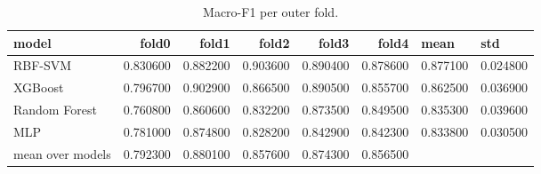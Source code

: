 \begin{table}
\caption{Macro-F1 per outer fold.}
\label{tab:s1_folds}
\begin{tabular}{lrrrrrll}
\toprule
model & fold0 & fold1 & fold2 & fold3 & fold4 & mean & std \\
\midrule
RBF-SVM & 0.830600 & 0.882200 & 0.903600 & 0.890400 & 0.878600 & 0.877100 & 0.024800 \\
XGBoost & 0.796700 & 0.902900 & 0.866500 & 0.890500 & 0.855700 & 0.862500 & 0.036900 \\
Random Forest & 0.760800 & 0.860600 & 0.832200 & 0.873500 & 0.849500 & 0.835300 & 0.039600 \\
MLP & 0.781000 & 0.874800 & 0.828200 & 0.842900 & 0.842300 & 0.833800 & 0.030500 \\
mean over models & 0.792300 & 0.880100 & 0.857600 & 0.874300 & 0.856500 &  &  \\
\bottomrule
\end{tabular}
\end{table}
